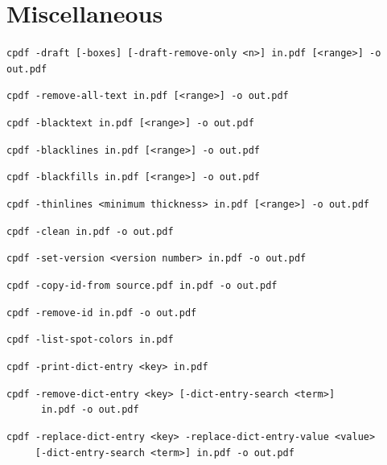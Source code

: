 \documentclass{book}
\begin{document}
\chapter{Miscellaneous}\label{chap:misc}\pagestyle{fancy}
  {\small\begin{framed}
  \noindent\verb!cpdf -draft [-boxes] [-draft-remove-only <n>] in.pdf [<range>] -o out.pdf!

  \vspace{1.5mm}
  \noindent\verb!cpdf -remove-all-text in.pdf [<range>] -o out.pdf!

  \vspace{1.5mm}
  \noindent\verb!cpdf -blacktext in.pdf [<range>] -o out.pdf!

  \vspace{1.5mm}
  \noindent\verb!cpdf -blacklines in.pdf [<range>] -o out.pdf!

  \vspace{1.5mm}
  \noindent\verb!cpdf -blackfills in.pdf [<range>] -o out.pdf!

  \vspace{1.5mm}
  \noindent\verb!cpdf -thinlines <minimum thickness> in.pdf [<range>] -o out.pdf!

  \vspace{1.5mm}
  \noindent\verb!cpdf -clean in.pdf -o out.pdf!

  \vspace{1.5mm}
  \noindent\verb!cpdf -set-version <version number> in.pdf -o out.pdf!

  \vspace{1.5mm}
  \noindent\verb!cpdf -copy-id-from source.pdf in.pdf -o out.pdf!

  \vspace{1.5mm}
  \noindent\verb!cpdf -remove-id in.pdf -o out.pdf!

  \vspace{1.5mm}
  \noindent\verb!cpdf -list-spot-colors in.pdf!

  \vspace{1.5mm}
  \noindent\verb!cpdf -print-dict-entry <key> in.pdf!

  \vspace{1.5mm}
  \noindent\verb!cpdf -remove-dict-entry <key> [-dict-entry-search <term>]!\\
  \noindent\verb!      in.pdf -o out.pdf!

  \vspace{1.5mm}
  \noindent\verb!cpdf -replace-dict-entry <key> -replace-dict-entry-value <value>!\\
  \noindent\verb!     [-dict-entry-search <term>] in.pdf -o out.pdf!


\end{framed}}
\end{document}
